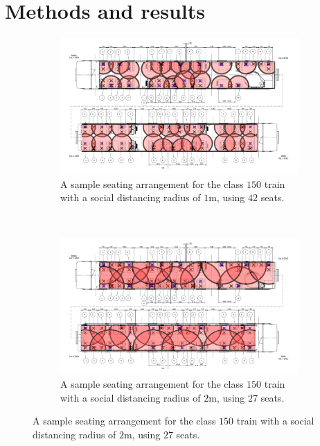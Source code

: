 \documentclass[11pt,a4paper]{article}
\begin{document}
\section*{Methods and results}



\begin{figure}[ht!]
\centering

\vspace{-1.5cm}

\begin{subfigure}[h]{0.95\linewidth}
\centering
\includegraphics[width = \linewidth]{overlay_1m_tfw.png}
\caption{A sample seating arrangement for the class $150$ train with a social distancing radius of $1$m, using $42$ seats.}
\label{Reference}
\end{subfigure}
~
\begin{subfigure}[h]{0.95\linewidth}
\centering
\includegraphics[width = \linewidth]{overlay_2m_tfw.png}
\caption{A sample seating arrangement for the class $150$ train with a social distancing radius of $2$m, using $27$ seats.}
\label{OneMetre1}
\end{subfigure}

\end{figure}
\end{document}
